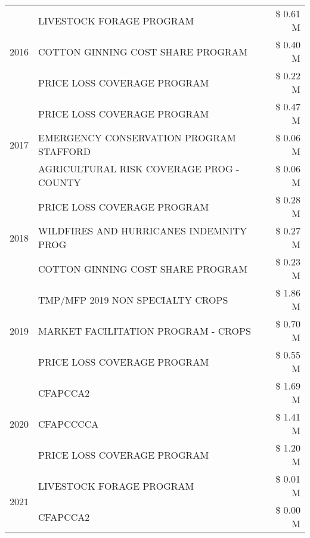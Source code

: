 \begin{tabular}{llr}
\cline{1-3}
\multirow[t]{3}{*}{2016} & LIVESTOCK FORAGE PROGRAM & \$ 0.61 M \\
 & COTTON GINNING COST SHARE PROGRAM & \$ 0.40 M \\
 & PRICE LOSS COVERAGE PROGRAM & \$ 0.22 M \\
\cline{1-3}
\multirow[t]{3}{*}{2017} & PRICE LOSS COVERAGE PROGRAM & \$ 0.47 M \\
 & EMERGENCY CONSERVATION PROGRAM STAFFORD & \$ 0.06 M \\
 & AGRICULTURAL RISK COVERAGE PROG - COUNTY & \$ 0.06 M \\
\cline{1-3}
\multirow[t]{3}{*}{2018} & PRICE LOSS COVERAGE PROGRAM & \$ 0.28 M \\
 & WILDFIRES AND HURRICANES INDEMNITY PROG & \$ 0.27 M \\
 & COTTON GINNING COST SHARE PROGRAM & \$ 0.23 M \\
\cline{1-3}
\multirow[t]{3}{*}{2019} & TMP/MFP 2019 NON SPECIALTY CROPS & \$ 1.86 M \\
 & MARKET FACILITATION PROGRAM - CROPS & \$ 0.70 M \\
 & PRICE LOSS COVERAGE PROGRAM & \$ 0.55 M \\
\cline{1-3}
\multirow[t]{3}{*}{2020} & CFAPCCA2 & \$ 1.69 M \\
 & CFAPCCCCA & \$ 1.41 M \\
 & PRICE LOSS COVERAGE PROGRAM & \$ 1.20 M \\
\cline{1-3}
\multirow[t]{2}{*}{2021} & LIVESTOCK FORAGE PROGRAM & \$ 0.01 M \\
 & CFAPCCA2 & \$ 0.00 M \\
\cline{1-3}
\bottomrule
\end{tabular}
